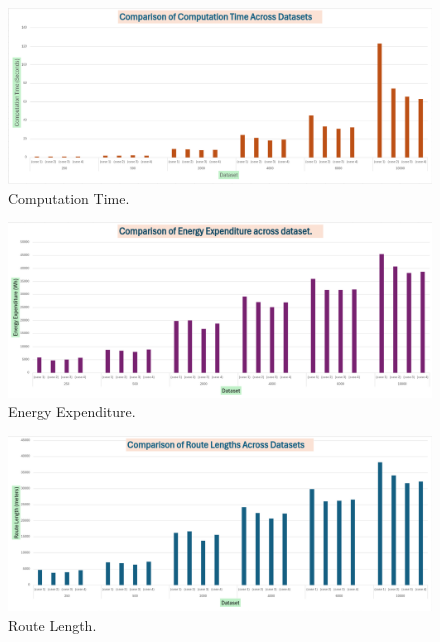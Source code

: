 \begin{figure}[H]
    \centering
    \includegraphics[width=\textwidth]{Images/plots/no_obs/Computation_time.png}
    \caption{Computation Time.}
    \label{fig:Computation_time}
\end{figure}

\begin{figure}[H]
    \centering
    \includegraphics[width=\textwidth]{Images/plots/no_obs/Energy.png}
    \caption{Energy Expenditure.}
    \label{fig:Energy_expenditure}
\end{figure}

\begin{figure}[H]
    \centering
    \includegraphics[width=\textwidth]{Images/plots/no_obs/Route_length.png}
    \caption{Route Length.}
    \label{fig:Route_length}
\end{figure}

